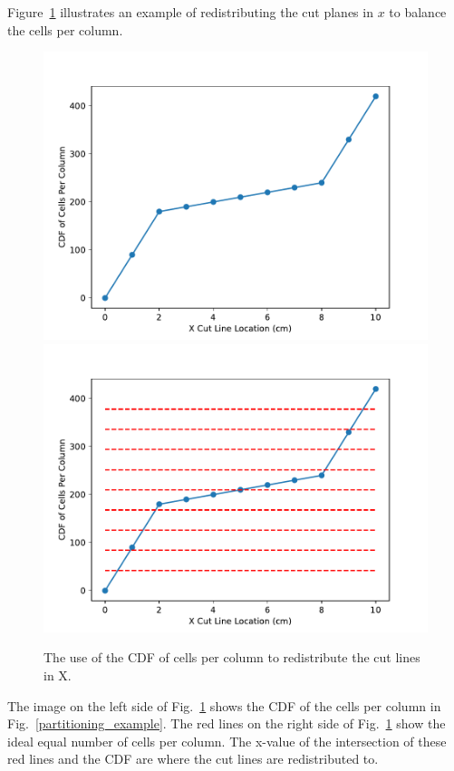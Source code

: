 Figure~\ref{redistribute} illustrates an example of redistributing the cut planes in $x$ to balance the cells per column.
\begin{figure}[H]
\centering
\includegraphics[scale=0.4]{../figures/spiderweb_redistribute_before_sparse.pdf}
\includegraphics[scale=0.4]{../figures/spiderweb_redistribute_after_sparse.pdf}
\caption{The use of the CDF of cells per column to redistribute the cut lines in X.}
\label{redistribute}
\end{figure}
The image on the left side of Fig.~\ref{redistribute} shows the CDF of the cells per column in Fig.~\ref{partitioning_example}. The red lines on the right side of Fig.~\ref{redistribute} show the ideal equal number of cells per column. The x-value of the intersection of these red lines and the CDF are where the cut lines are redistributed to.

